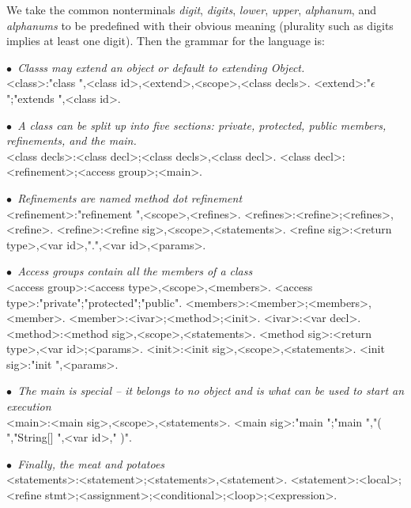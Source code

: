 We take the common nonterminals \emph{digit}, \emph{digits}, \emph{lower}, \emph{upper}, \emph{alphanum}, and \emph{alphanums} to be predefined with their obvious meaning (plurality such as digits implies at least one digit). Then the grammar for the language is:

\newcommand{\comment}[1]{{\escapegrammar$\bullet$\it\ #1}\\}

\begin{grammar}

\comment{Classs may extend an object or default to extending Object.}
<class>:"class ",<class id>,<extend>,<scope>,<class decls>.
<extend>:"$\epsilon$";"extends ",<class id>.

\comment{A class can be split up into five sections: private, protected, public members, refinements, and the main.}
<class decls>:<class decl>;<class decls>,<class decl>.
<class decl>:<refinement>;<access group>;<main>.

\comment{Refinements are named method dot refinement}
<refinement>:"refinement ",<scope>,<refines>.
<refines>:<refine>;<refines>,<refine>.
<refine>:<refine sig>,<scope>,<statements>.
<refine sig>:<return type>,<var id>,".",<var id>,<params>.

\comment{Access groups contain all the members of a class}
<access group>:<access type>,<scope>,<members>.
<access type>:"private";"protected";"public".
<members>:<member>;<members>,<member>.
<member>:<ivar>;<method>;<init>.
<ivar>:<var decl>.
<method>:<method sig>,<scope>,<statements>.
<method sig>:<return type>,<var id>;<params>.
<init>:<init sig>,<scope>,<statements>.
<init sig>:"init ",<params>.

\comment{The main is special -- it belongs to no object and is what can be used to start an execution}
<main>:<main sig>,<scope>,<statements>.
<main sig>:"main ";"main ","( ","String[] ",<var id>," )".

\comment{Finally, the meat and potatoes}
<statements>:<statement>;<statements>,<statement>.
<statement>:<local>;<refine stmt>;<assignment>;<conditional>;<loop>;<expression>.


\end{grammar}
